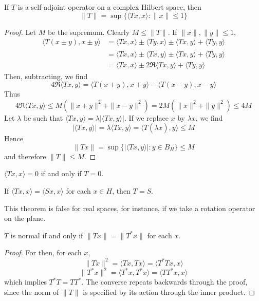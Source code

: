\begin{theorem}
    If $T$ is a self-adjoint operator on a complex Hilbert space, then
    \[ \| T \| = \sup \{ \langle Tx, x \rangle: \| x \| \leq 1 \} \]
\end{theorem}
\begin{proof}
    Let $M$ be the supremum. Clearly $M \leq \| T \|$. If $\| x \|, \| y \| \leq 1$,
    \begin{align*}
        \langle T(x \pm y), x \pm y \rangle &= \langle Tx, x \rangle \pm \langle Ty, x \rangle \pm \langle Tx, y \rangle + \langle Ty, y \rangle\\
        &= \langle Tx, x \rangle \pm \overline{\langle Tx, y \rangle} \pm \langle Tx, y \rangle + \langle Ty, y \rangle\\
        &= \langle Tx, x \rangle \pm 2 \Re \langle Tx, y \rangle + \langle Ty, y \rangle
    \end{align*}
    Then, subtracting, we find
    \[ 4\Re \langle Tx, y \rangle = \langle T(x+y),x+y \rangle - \langle T(x - y), x - y \rangle \]
    Thus
    \[ 4 \Re \langle Tx, y \rangle \leq M(\|x + y\|^2 + \|x - y\|^2) = 2M(\|x\|^2 + \|y\|^2) \leq 4M \]
    Let $\lambda$ be such that $\langle Tx, y \rangle = \lambda |\langle Tx, y \rangle|$. If we replace $x$ by $\lambda x$, we find
    \[ |\langle Tx, y \rangle| = \overline{\lambda} \langle Tx, y \rangle = \langle T(\overline{\lambda}x), y \rangle \leq M \]
    Hence
    \[ \| Tx \| = \sup \{ |\langle Tx, y \rangle| : y \in B_H \} \leq M \]
    and therefore $\|T\| \leq M$.
\end{proof}

\begin{corollary}
    $\langle Tx, x \rangle = 0$ if and only if $T = 0$.
\end{corollary}
\begin{corollary}
    If $\langle Tx, x \rangle = \langle Sx, x \rangle$ for each $x \in H$, then $T = S$.
\end{corollary}

This theorem is false for real spaces, for instance, if we take a rotation operator on the plane.

\begin{theorem}
    $T$ is normal if and only if $\| Tx \| = \| T^* x \|$ for each $x$.
\end{theorem}
\begin{proof}
    For then, for each $x$,
    \[ \| Tx \|^2 = \langle Tx, Tx \rangle = \langle T^*Tx, x \rangle \]
    \[ \| T^*x \|^2 = \langle T^*x, T^*x \rangle = \langle TT^*x, x \rangle \]
    which implies $T^*T = TT^*$. The converse repeats backwards through the proof, since the norm of $\| T \|$ is specified by its action through the inner product.
\end{proof}

